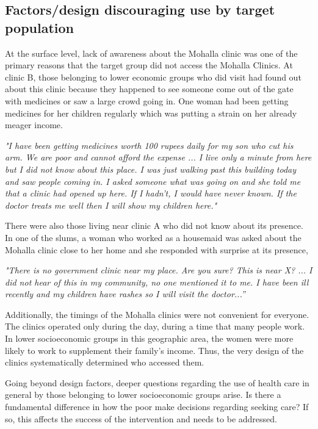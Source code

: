 \subsection{Factors/design discouraging use by target population} %
At the surface level, lack of awareness about the Mohalla clinic was one of the primary reasons that the target group did not access the Mohalla Clinics. At clinic B, those belonging to lower economic groups who did visit had found out about this clinic because they happened to see someone come out of the gate with medicines or saw a large crowd going in. One woman had been getting medicines for her children regularly which was putting a strain on her already meager income. 

\textit{"I have been getting medicines worth 100 rupees daily for my son who cut his arm. We are poor and cannot afford the expense ... I live only a minute from here but I did not know about this place. I was just walking past this building today and saw people coming in. I asked someone what was going on and she told me that a clinic had opened up here. If I hadn't, I would have never known. If the doctor treats me well then I will show my children here."}

There were also those living near clinic A who did not know about its presence. In one of the slums, a woman who worked as a housemaid was asked about the Mohalla clinic close to her home and she responded with surprise at its presence,

\textit{"There is no government clinic near my place. Are you sure? This is near X? ... I did not hear of this in my community, no one mentioned it to me. I have been ill recently and my children have rashes so I will visit the doctor...”}

Additionally, the timings of the Mohalla clinics were not convenient for everyone. The clinics operated only during the day, during a time that many people work. In lower socioeconomic groups in this geographic area, the women were more likely to work to supplement their family's income. Thus, the very design of the clinics systematically determined who accessed them.

Going beyond design factors, deeper questions regarding the use of health care in general by those belonging to lower socioeconomic groups arise. Is there a fundamental difference in how the poor make decisions regarding seeking care? If so, this affects the success of the intervention and needs to be addressed.

